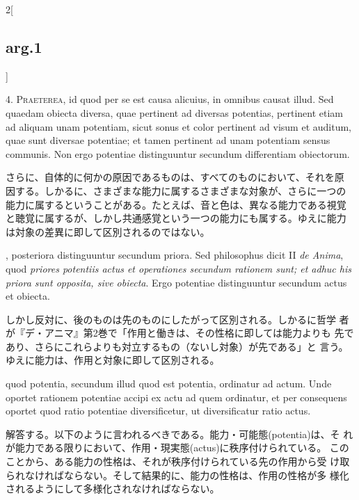 \documentclass[paper=a4paper,fontsize=10pt,jafontsize=9pt,titlepage]{jlreq}
\begin{document}
\begin{paracol}{2}[\subsection{arg.1}]

4. {\scshape Praeterea}, id quod per se est causa alicuius, in omnibus
causat illud. Sed quaedam obiecta diversa, quae pertinent ad diversas
potentias, pertinent etiam ad aliquam unam potentiam, sicut sonus et
color pertinent ad visum et auditum, quae sunt diversae potentiae; et
tamen pertinent ad unam potentiam sensus communis. Non ergo potentiae
distinguuntur secundum differentiam obiectorum.

 
\switchcolumn

さらに、自体的に何かの原因であるものは、すべてのものにおいて、それを原
因する。しかるに、さまざまな能力に属するさまざまな対象が、さらに一つの
能力に属するということがある。たとえば、音と色は、異なる能力である視覚
と聴覚に属するが、しかし共通感覚という一つの能力にも属する。ゆえに能力
は対象の差異に即して区別されるのではない。


, posteriora distinguuntur secundum priora. Sed
 philosophus dicit II {\itshape de Anima}, quod {\itshape priores
 potentiis actus et operationes secundum rationem sunt; et adhuc his
 priora sunt opposita, sive obiecta}. Ergo potentiae distinguuntur
 secundum actus et obiecta.
 
\switchcolumn

 しかし反対に、後のものは先のものにしたがって区別される。しかるに哲学
 者が『デ・アニマ』第2巻で「作用と働きは、その性格に即しては能力よりも
 先であり、さらにこれらよりも対立するもの（ないし対象）が先である」と
 言う。ゆえに能力は、作用と対象に即して区別される。



 quod potentia, secundum illud quod est
 potentia, ordinatur ad actum. Unde oportet rationem potentiae accipi
 ex actu ad quem ordinatur, et per consequens oportet quod ratio
 potentiae diversificetur, ut diversificatur ratio actus.

\switchcolumn

解答する。以下のように言われるべきである。能力・可能態(potentia)は、そ
れが能力である限りにおいて、作用・現実態(actus)に秩序付けられている。
このことから、ある能力の性格は、それが秩序付けられている先の作用から受
け取られなければならない。そして結果的に、能力の性格は、作用の性格が多
様化されるようにして多様化されなければならない。


\end{paracol}
\end{document}
